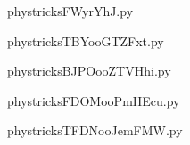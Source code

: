     

    \clearpage
    


    \newcommand{\CaptionFigFWyrYhJ}{<+Type your caption here+>}
    \begin{center}
        
    \end{center}
    phystricksFWyrYhJ.py

    

    \clearpage
    


    \newcommand{\CaptionFigTBYooGTZFxt}{<+Type your caption here+>}
    \begin{center}
        
    \end{center}
    phystricksTBYooGTZFxt.py

    

    \clearpage
    


    \newcommand{\CaptionFigBJPOooZTVHhi}{<+Type your caption here+>}
    \begin{center}
        
    \end{center}
    phystricksBJPOooZTVHhi.py

    

    \clearpage
    


    \newcommand{\CaptionFigFDOMooPmHEcu}{<+Type your caption here+>}
    \begin{center}
        
    \end{center}
    phystricksFDOMooPmHEcu.py

    

    \clearpage
    


    \newcommand{\CaptionFigTFDNooJemFMW}{<+Type your caption here+>}
    \begin{center}
        
    \end{center}
    phystricksTFDNooJemFMW.py

    

    \clearpage
    


